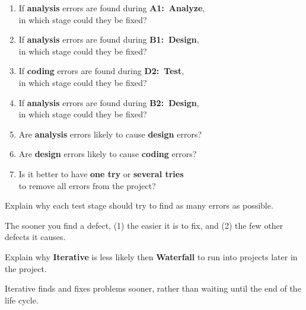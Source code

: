 \begin{enumerate}%

\setlength{\defaultwidth}{8em}

\item If \textbf{analysis} errors are found during \textbf{A1:~Analyze}, \\ in which stage could they be fixed?

\item If \textbf{analysis} errors are found during \textbf{B1:~Design}, \\ in which stage could they be fixed?

\item If \textbf{coding} errors are found during \textbf{D2:~Test}, \\ in which stage could they be fixed?

\item If \textbf{analysis} errors are found during \textbf{B2:~Design}, \\ in which stage could they be fixed?

\item Are \textbf{analysis} errors likely to cause \textbf{design} errors?

\item Are \textbf{design} errors likely to cause \textbf{coding} errors?

\item Is it better to have \textbf{one try} or \textbf{several tries} \\ to remove all errors from the project?

\end{enumerate}


\Q Explain why each test stage should try to find as many errors as possible.

\begin{answer}[5em]
The sooner you find a defect, (1) the easier it is to fix, and (2) the few other defects it causes.
\end{answer}


\Q Explain why \textbf{Iterative} is less likely then \textbf{Waterfall} to run into projects later in the project.

\begin{answer}[5em]
Iterative finds and fixes problems sooner, rather than waiting until the end of the life cycle.
\end{answer}
